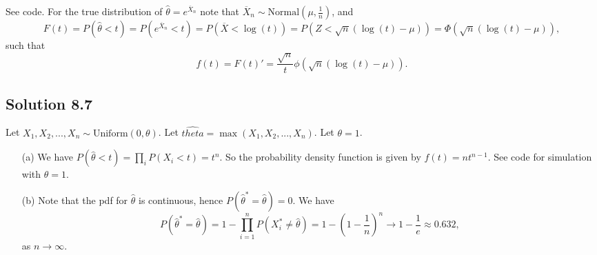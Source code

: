 See code.
For the true distribution of $\hat{\theta} = e^{\overline{X}_n}$ note that $\overline{X}_n \sim \mathrm{Normal}(\mu, \frac{1}{n})$, and
\begin{equation*}
    F(t)
        = P(\hat{\theta} < t)
        = P\left(e^{\overline{X}_n} < t\right)
        = P(\overline{X} < \log(t))
        = P(Z < \sqrt{n}(\log(t) - \mu))
        = \Phi(\sqrt{n}(\log(t) - \mu)),
\end{equation*}
such that
\begin{equation*}
    f(t)
        = F(t)'
        = \frac{\sqrt{n}}{t} \phi(\sqrt{n}(\log(t) - \mu)).
\end{equation*}


\subsection*{Solution 8.7}

Let $X_1, X_2, ..., X_n \sim \mathrm{Uniform}(0, \theta)$.
Let $\hat{theta} = \max(X_1, X_2, ..., X_n)$.
Let $\theta = 1$.
\begin{itemize}
    \item[(a)] We have $P(\hat{\theta} < t) = \prod_i P(X_i < t) = t^n$.
        So the probability density function is given by $f(t) = nt^{n-1}$.
        See code for simulation with $\theta = 1$.
    \item[(b)] Note that the pdf for $\hat{\theta}$ is continuous, hence $P(\hat{\theta}^* = \hat{\theta}) = 0$.
        We have
        \begin{equation*}
            P(\hat{\theta}^* = \hat{\theta})
                = 1 - \prod_{i = 1}^n P(X_i^* \neq \hat{\theta})
                = 1 - \left(1 - \frac{1}{n}\right)^n
                \to 1 - \frac{1}{e} \approx 0.632,
        \end{equation*}
        as $n \to \infty$.
\end{itemize}
